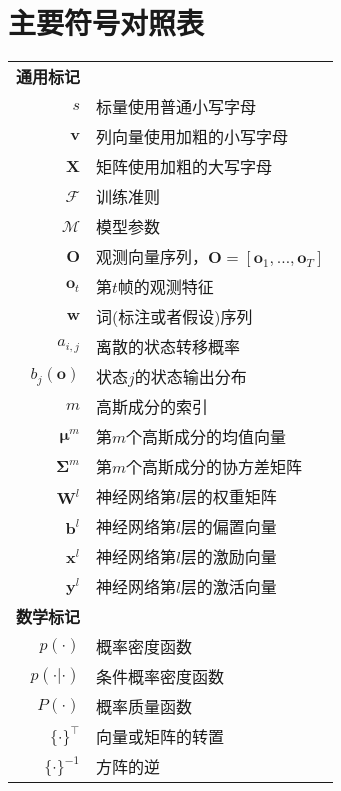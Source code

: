 \chapter{主要符号对照表}
\label{chap:symb}

\begin{longtable}{rl}
\textbf{通用标记} \\
$s$ & 标量使用普通小写字母 \\
$\mathbf{v}$ & 列向量使用加粗的小写字母 \\
$\mathbf{X}$ & 矩阵使用加粗的大写字母 \\
$\mathcal{F}$ & 训练准则 \\
$\mathcal{M}$ & 模型参数 \\
$\mathbf{O}$ & 观测向量序列，$\mathbf{O}=[ \mathbf{o}_1, \dots, \mathbf{o}_T ]$ \\
$\mathbf{o}_t$ & 第$t$帧的观测特征 \\
$\mathbf{w}$ & 词(标注或者假设)序列 \\
$a_{i,j}$ & 离散的状态转移概率 \\
$b_j(\mathbf{o})$ & 状态$j$的状态输出分布 \\
$m$ & 高斯成分的索引 \\
$\bm{\mu}^{m}$ & 第$m$个高斯成分的均值向量 \\
$\bm{\Sigma}^{m}$ & 第$m$个高斯成分的协方差矩阵 \\
$\mathbf{W}^l$ & 神经网络第$l$层的权重矩阵 \\
$\mathbf{b}^l$ & 神经网络第$l$层的偏置向量 \\
$\mathbf{x}^l$ & 神经网络第$l$层的激励向量 \\
$\mathbf{y}^l$ & 神经网络第$l$层的激活向量 \\

\textbf{数学标记} \\
$p(\cdot)$ & 概率密度函数 \\
$p(\cdot|\cdot)$ & 条件概率密度函数 \\
$P(\cdot)$ & 概率质量函数 \\
$\{ \cdot \}^{\top}$ & 向量或矩阵的转置 \\
$\{ \cdot \}^{-1}$ & 方阵的逆 \\



\end{longtable}
